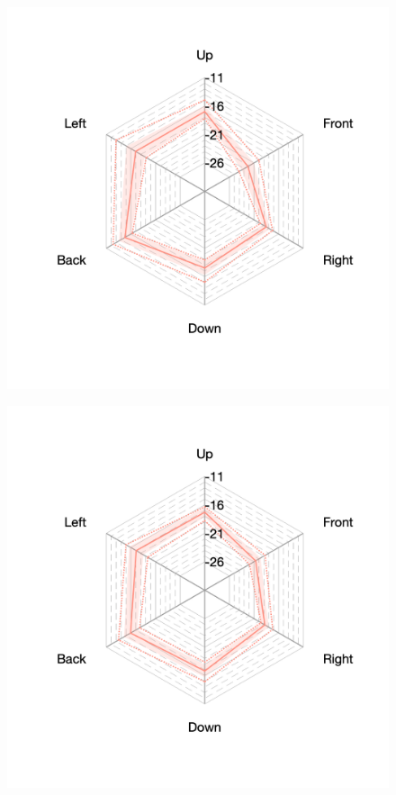 \documentclass[11pt,a4j]{jreport}
\begin{document}
\begin{figure}[H]
  \begin{minipage}[b]{.33\textwidth}
    \centering
    \includegraphics[width=1\linewidth]{images/realHallDirSt/early_hall_d_allpoints.png}
    \label{fig:ホールDにおけるSTEarly}
  \end{minipage}%
  \begin{minipage}[b]{.33\textwidth}
    \centering
    \includegraphics[width=1\linewidth]{images/realHallDirSt/early_hall_e_allpoints.png}

\end{minipage}
\end{figure}
\end{document}
